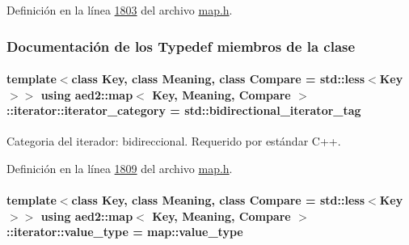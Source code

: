 Definición en la línea \hyperlink{map_8h_source_l01803}{1803} del archivo \hyperlink{map_8h_source}{map.\+h}.



\subsubsection{Documentación de los \textquotesingle{}Typedef\textquotesingle{} miembros de la clase}
\paragraph[{\texorpdfstring{iterator\+\_\+category}{iterator_category}}]{\setlength{\rightskip}{0pt plus 5cm}template$<$class Key, class Meaning, class Compare = std\+::less$<$\+Key$>$$>$ using {\bf aed2\+::map}$<$ Key, Meaning, Compare $>$\+::{\bf iterator\+::iterator\+\_\+category} =  std\+::bidirectional\+\_\+iterator\+\_\+tag}\hypertarget{classaed2_1_1map_1_1iterator_a709df3d8aef6fd1eeb839616b554ff0b_a709df3d8aef6fd1eeb839616b554ff0b}{}\label{classaed2_1_1map_1_1iterator_a709df3d8aef6fd1eeb839616b554ff0b_a709df3d8aef6fd1eeb839616b554ff0b}


Categoria del iterador\+: bidireccional. Requerido por estándar C++. 



Definición en la línea \hyperlink{map_8h_source_l01809}{1809} del archivo \hyperlink{map_8h_source}{map.\+h}.

\paragraph[{\texorpdfstring{value\+\_\+type}{value_type}}]{\setlength{\rightskip}{0pt plus 5cm}template$<$class Key, class Meaning, class Compare = std\+::less$<$\+Key$>$$>$ using {\bf aed2\+::map}$<$ Key, Meaning, Compare $>$\+::{\bf iterator\+::value\+\_\+type} =  {\bf map\+::value\+\_\+type}}\hypertarget{classaed2_1_1map_1_1iterator_a4e1d954ef5c6a64bbcd881854f039a16_a4e1d954ef5c6a64bbcd881854f039a16}{}\label{classaed2_1_1map_1_1iterator_a4e1d954ef5c6a64bbcd881854f039a16_a4e1d954ef5c6a64bbcd881854f039a16}


